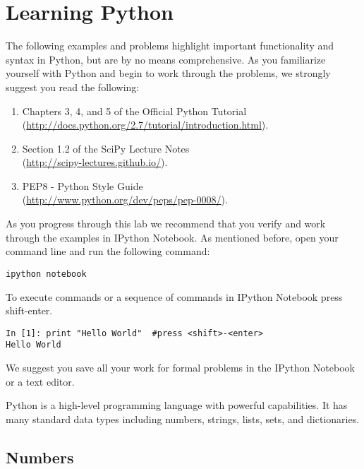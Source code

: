 \section*{Learning Python}

The following examples and problems highlight important functionality and syntax in Python, but are by no means comprehensive.  As you familiarize yourself with Python and begin to work through the problems, we strongly suggest you read the following:

\begin{enumerate}
\item Chapters 3, 4, and 5 of the Official Python Tutorial \\
        (\url{http://docs.python.org/2.7/tutorial/introduction.html}).
\item Section 1.2 of the SciPy Lecture Notes \\
        (\url{http://scipy-lectures.github.io/}).
\item PEP8 - Python Style Guide \\
        (\url{http://www.python.org/dev/peps/pep-0008/}).
\end{enumerate}


As you progress through this lab we recommend that you verify and work 
through the examples in IPython Notebook. As mentioned before, open your command line and run the following command: 
\begin{lstlisting}
ipython notebook
\end{lstlisting}
To execute commands or a sequence of commands in IPython Notebook press shift-enter.

\begin{lstlisting}
In [1]: print "Hello World"  #press <shift>-<enter>
Hello World
\end{lstlisting}

We suggest you save all your work for formal problems in the 
IPython Notebook or a text editor. 

Python is a high-level programming language with powerful capabilities. 
It has many standard data types including numbers, strings, lists, sets, and dictionaries. 

\subsection*{Numbers}

